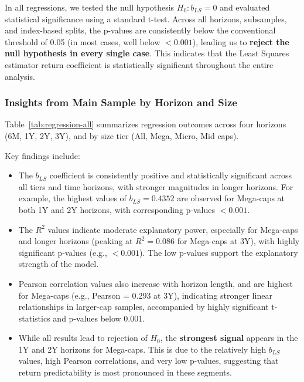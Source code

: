 \documentclass[11pt]{article}
\begin{document}
In all regressions, we tested the null hypothesis $H_0: b_{LS} = 0$ and evaluated statistical significance using a standard t-test. Across all horizons, subsamples, and index-based splits, the p-values are consistently below the conventional threshold of 0.05 (in most cases, well below $<0.001$), leading us to \textbf{reject the null hypothesis in every single case}. This indicates that the Least Squares estimator return coefficient is statistically significant throughout the entire analysis.

\subsubsection{Insights from Main Sample by Horizon and Size}

Table~\ref{tab:regression-all} summarizes regression outcomes across four horizons (6M, 1Y, 2Y, 3Y), and by size tier (All, Mega, Micro, Mid caps).

Key findings include:

\begin{itemize}
    \item The $b_{LS}$ coefficient is consistently positive and statistically significant across all tiers and time horizons, with stronger magnitudes in longer horizons. For example, the highest values of $b_{LS} = 0.4352$ are observed for Mega-caps at both 1Y and 2Y horizons, with corresponding p-values $<0.001$.
    
    \item The $R^2$ values indicate moderate explanatory power, especially for Mega-caps and longer horizons (peaking at $R^2 = 0.086$ for Mega-caps at 3Y), with highly significant p-values (e.g., $<0.001$). The low p-values support the explanatory strength of the model.

    \item Pearson correlation values also increase with horizon length, and are highest for Mega-caps (e.g., Pearson = 0.293 at 3Y), indicating stronger linear relationships in larger-cap samples, accompanied by highly significant t-statistics and p-values below 0.001.

    \item While all results lead to rejection of $H_0$, the \textbf{strongest signal} appears in the 1Y and 2Y horizons for Mega-caps. This is due to the relatively high $b_{LS}$ values, high Pearson correlations, and very low p-values, suggesting that return predictability is most pronounced in these segments.
\end{itemize}
\end{document}
